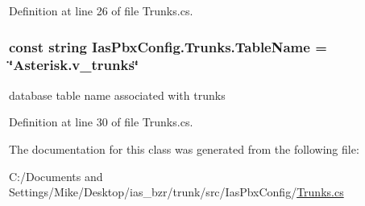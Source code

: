 Definition at line 26 of file Trunks.cs.\hypertarget{class_ias_pbx_config_1_1_trunks_ae79cf02106338e52ae7613b5dff2a705}{
\subsubsection[{TableName}]{\setlength{\rightskip}{0pt plus 5cm}const string {\bf IasPbxConfig.Trunks.TableName} = \char`\"{}Asterisk.v\_\-trunks\char`\"{}}}
\label{class_ias_pbx_config_1_1_trunks_ae79cf02106338e52ae7613b5dff2a705}


database table name associated with trunks 

Definition at line 30 of file Trunks.cs.

The documentation for this class was generated from the following file:\begin{DoxyCompactItemize}
\item 
C:/Documents and Settings/Mike/Desktop/ias\_\-bzr/trunk/src/IasPbxConfig/\hyperlink{_trunks_8cs}{Trunks.cs}\end{DoxyCompactItemize}
